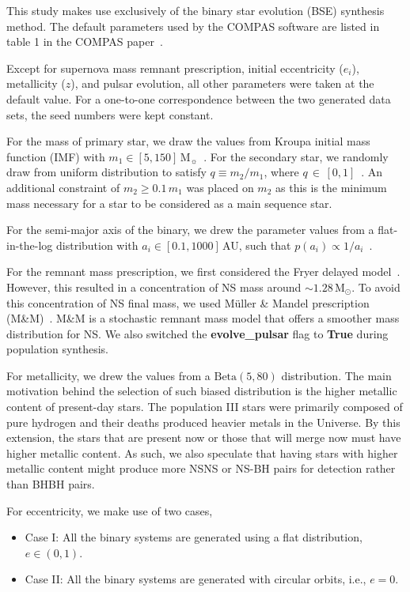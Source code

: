 \documentclass[journal, twocolumn]{IEEEtran}
\begin{document}
    This study makes use exclusively of the binary star evolution (BSE) synthesis method.
    The default parameters used by the COMPAS software are listed in table 1 in the COMPAS paper~\cite{Riley2022}.

    Except for supernova mass remnant prescription, initial eccentricity ($e_i$), metallicity ($z$), and pulsar evolution, all other parameters were taken at the default value.
    For a one-to-one correspondence between the two generated data sets, the seed numbers were kept constant.

    For the mass of primary star, we draw the values from Kroupa initial mass function (IMF) with $m_1 \in [5, 150]\,\text{M}_\sun$~\cite{kroupa2001variation}.
    For the secondary star, we randomly draw from uniform distribution to satisfy $q\equiv m_2/m_1$, where $q\,\in\,[0, 1]$~\cite{sana2012binary}.
    An additional constraint of $m_2 \geq 0.1\,m_1$ was placed on $m_2$ as this is the minimum mass necessary for a star to be considered as a main sequence star.

    For the semi-major axis of the binary, we drew the parameter values from a flat-in-the-log distribution with $a_i \in [0.1, 1000]\,$AU, such that $p(a_i) \propto 1/a_i$~\cite{opik1924photographic}.

    For the remnant mass prescription, we first considered the Fryer delayed model~\cite{Fryer2012}.
    However, this resulted in a concentration of NS mass around $\sim1.28\,\text{M}_\odot$.
    To avoid this concentration of NS final mass, we used Müller \& Mandel prescription (M\&M)~\cite{Mandel2020}.
    M\&M is a stochastic remnant mass model that offers a smoother mass distribution for NS\@.
    We also switched the \textbf{evolve\_pulsar} flag to \textbf{True} during population synthesis.

    For metallicity, we drew the values from a $\text{Beta}(5, 80)$ distribution.
    The main motivation behind the selection of such biased distribution is the higher metallic content of present-day stars.
    The population III stars were primarily composed of pure hydrogen and their deaths produced heavier metals in the Universe.
    By this extension, the stars that are present now or those that will merge now must have higher metallic content.
    As such, we also speculate that having stars with higher metallic content might produce more NSNS or NS-BH pairs for detection rather than BHBH pairs.

    For eccentricity, we make use of two cases,
    \begin{itemize}
        \item Case I: All the binary systems are generated using a flat distribution, $e \in (0, 1)$.
        \item Case II: All the binary systems are generated with circular orbits, i.e., $e = 0$.
    \end{itemize}
\end{document}

